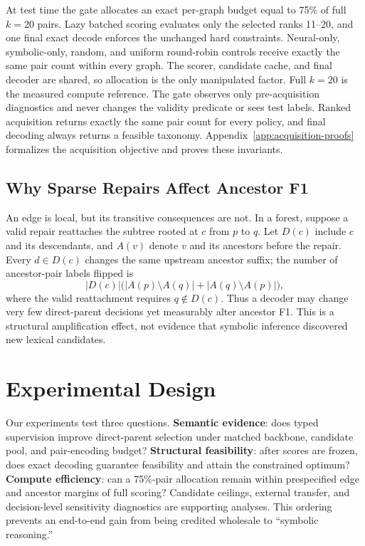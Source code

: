 \documentclass[11pt]{article}
\begin{document}
At test time the gate allocates an exact per-graph budget equal to 75\% of
full $k=20$ pairs. Lazy batched scoring evaluates only the selected ranks
11--20, and one final exact decode enforces the unchanged hard
constraints. Neural-only, symbolic-only, random, and uniform
round-robin controls receive exactly the same pair count within every graph.
The scorer, candidate cache, and final decoder are shared, so allocation is
the only manipulated factor. Full $k=20$ is the measured compute reference.
The gate observes only pre-acquisition diagnostics and never changes the
validity predicate or sees test labels. Ranked acquisition returns exactly the same
pair count for every policy, and final decoding always returns a feasible
taxonomy. Appendix~\ref{app:acquisition-proofs} formalizes the acquisition
objective and proves these invariants.


\subsection{Why Sparse Repairs Affect Ancestor F1}

An edge is local, but its transitive consequences are not.  In a forest,
suppose a valid repair reattaches the subtree rooted at $c$ from $p$ to $q$.
Let $D(c)$ include $c$ and its descendants, and $A(v)$ denote $v$ and its
ancestors before the repair.  Every $d\in D(c)$ changes the same upstream
ancestor suffix; the number of ancestor-pair labels flipped is
\begin{equation}
 |D(c)|\bigl(|A(p)\setminus A(q)|+|A(q)\setminus A(p)|\bigr),
 \label{eq:amplification}
\end{equation}
where the valid reattachment requires $q\notin D(c)$.
Thus a decoder may change very few direct-parent decisions yet measurably
alter ancestor F1.  This is a structural amplification effect, not evidence
that symbolic inference discovered new lexical candidates.

\section{Experimental Design}

Our experiments test three questions. \textbf{Semantic evidence}: does typed
supervision improve direct-parent selection under matched backbone, candidate
pool, and pair-encoding budget? \textbf{Structural feasibility}: after scores
are frozen, does exact decoding guarantee feasibility and attain the constrained optimum?
\textbf{Compute efficiency}: can a 75\%-pair allocation remain within
prespecified edge and ancestor margins of full scoring? Candidate ceilings,
external transfer, and decision-level sensitivity diagnostics are supporting analyses.
This ordering prevents an end-to-end gain from being credited wholesale to
``symbolic reasoning.''
\end{document}

